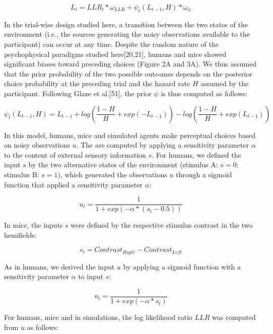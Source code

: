 \documentclass[
]{article}
\begin{document}
\begin{equation}
L_t = LLR_t * \omega_{LLR} + \psi_t(L_{t-1}, H) * \omega_{\psi}
\end{equation}

In the trial-wise design studied here, a transition between the two
states of the environment (i.e., the sources generating the noisy
observations available to the participant) can occur at any time.
Despite the random nature of the psychophysical paradigms studied
here{[}20,21{]}, humans and mice showed significant biases toward
preceding choices (Figure 2A and 3A). We thus assumed that the prior
probability of the two possible outcomes depends on the posterior choice
probability at the preceding trial and the hazard rate \(H\) assumed by
the participant. Following Glaze et al.{[}51{]}, the prior \(\psi\) is
thus computed as follows:

\begin{equation}
\psi_t(L_{t-1}, H)  = L_{t-1} + log(\frac{1-H}{H} + exp(-L_{t-1})) - log(\frac{1-H}{H} + exp(L_{t-1}))
\end{equation}

In this model, humans, mice and simulated agents make perceptual choices
based on noisy observations \(u\). The are computed by applying a
sensitivity parameter \(\alpha\) to the content of external sensory
information \(s\). For humans, we defined the input \(s\) by the two
alternative states of the environment (stimulus A: \(s = 0\); stimulus
B: \(s = 1\)), which generated the observations \(u\) through a sigmoid
function that applied a sensitivity parameter \(\alpha\):

\begin{equation}
u_t = \frac{1}{1+exp(-\alpha*(s_t-0.5))}
\end{equation}

In mice, the inputs \(s\) were defined by the respective stimulus
contrast in the two hemifields:

\begin{equation}
s_t = Contrast_{Right} - Contrast_{Left}
\end{equation}

As in humans, we derived the input \(u\) by applying a sigmoid function
with a sensitivity parameter \(\alpha\) to input \(s\):

\begin{equation}
u_t = \frac{1}{1 + exp(-\alpha * s_t)}
\end{equation}

For humans, mice and in simulations, the log likelihood ratio \(LLR\)
was computed from \(u\) as follows:
\end{document}
